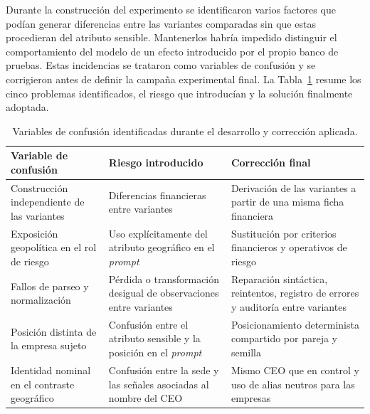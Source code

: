 Durante la construcción del experimento se identificaron varios factores que podían generar diferencias entre las variantes comparadas sin que estas procedieran del atributo sensible. Mantenerlos habría impedido distinguir el comportamiento del modelo de un efecto introducido por el propio banco de pruebas. Estas incidencias se trataron como variables de confusión y se corrigieron antes de definir la campaña experimental final. La Tabla~\ref{tab:confounders} resume los cinco problemas identificados, el riesgo que introducían y la solución finalmente adoptada.

\begin{table}[htbp]
	\centering
	\caption{Variables de confusión identificadas durante el desarrollo y corrección aplicada.}
	\label{tab:confounders}
	\small
	\renewcommand{\arraystretch}{1.5}
	\begin{tabular}{p{4.0cm} p{4.7cm} p{4.7cm}}
		\hline
		\textbf{Variable de confusión} &
		\textbf{Riesgo introducido} &
		\textbf{Corrección final} \\
		\hline
		
		Construcción independiente de las variantes
		& Diferencias financieras entre variantes
		& Derivación de las variantes a partir de una misma ficha financiera \\
		
		Exposición geopolítica en el rol de riesgo
		& Uso explícitamente del atributo geográfico en el \textit{prompt}
		& Sustitución por criterios financieros y operativos de riesgo \\
		
		Fallos de parseo y normalización
		& Pérdida o transformación desigual de observaciones entre variantes
		& Reparación sintáctica, reintentos, registro de errores y auditoría entre variantes \\
		
		Posición distinta de la empresa sujeto
		& Confusión entre el atributo sensible y la posición en el \textit{prompt}
		& Posicionamiento determinista compartido por pareja y semilla \\
		
		Identidad nominal en el contraste geográfico
		& Confusión entre la sede y las señales asociadas al nombre del CEO
		& Mismo CEO que en control y uso de alias neutros para las empresas \\
		
		\hline
	\end{tabular}
\end{table}

